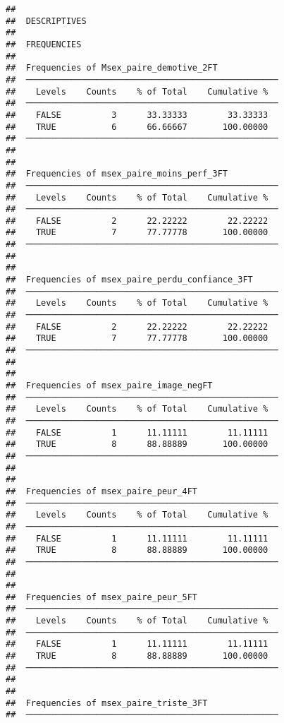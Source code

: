 \documentclass[
]{article}
\begin{document}
\begin{verbatim}
## 
##  DESCRIPTIVES
## 
##  FREQUENCIES
## 
##  Frequencies of Msex_paire_demotive_2FT             
##  ────────────────────────────────────────────────── 
##    Levels    Counts    % of Total    Cumulative %   
##  ────────────────────────────────────────────────── 
##    FALSE          3      33.33333        33.33333   
##    TRUE           6      66.66667       100.00000   
##  ────────────────────────────────────────────────── 
## 
## 
##  Frequencies of msex_paire_moins_perf_3FT           
##  ────────────────────────────────────────────────── 
##    Levels    Counts    % of Total    Cumulative %   
##  ────────────────────────────────────────────────── 
##    FALSE          2      22.22222        22.22222   
##    TRUE           7      77.77778       100.00000   
##  ────────────────────────────────────────────────── 
## 
## 
##  Frequencies of msex_paire_perdu_confiance_3FT      
##  ────────────────────────────────────────────────── 
##    Levels    Counts    % of Total    Cumulative %   
##  ────────────────────────────────────────────────── 
##    FALSE          2      22.22222        22.22222   
##    TRUE           7      77.77778       100.00000   
##  ────────────────────────────────────────────────── 
## 
## 
##  Frequencies of msex_paire_image_negFT              
##  ────────────────────────────────────────────────── 
##    Levels    Counts    % of Total    Cumulative %   
##  ────────────────────────────────────────────────── 
##    FALSE          1      11.11111        11.11111   
##    TRUE           8      88.88889       100.00000   
##  ────────────────────────────────────────────────── 
## 
## 
##  Frequencies of msex_paire_peur_4FT                 
##  ────────────────────────────────────────────────── 
##    Levels    Counts    % of Total    Cumulative %   
##  ────────────────────────────────────────────────── 
##    FALSE          1      11.11111        11.11111   
##    TRUE           8      88.88889       100.00000   
##  ────────────────────────────────────────────────── 
## 
## 
##  Frequencies of msex_paire_peur_5FT                 
##  ────────────────────────────────────────────────── 
##    Levels    Counts    % of Total    Cumulative %   
##  ────────────────────────────────────────────────── 
##    FALSE          1      11.11111        11.11111   
##    TRUE           8      88.88889       100.00000   
##  ────────────────────────────────────────────────── 
## 
## 
##  Frequencies of msex_paire_triste_3FT               
##  ────────────────────────────────────────────────── 

\end{verbatim}
\end{document}
